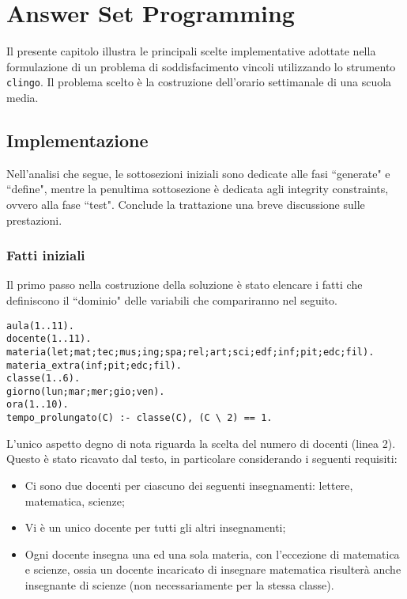 \chapter{Answer Set Programming}

Il presente capitolo illustra le principali scelte implementative adottate nella formulazione di un problema di soddisfacimento vincoli utilizzando lo strumento \texttt{clingo}. Il problema scelto è la costruzione dell'orario settimanale di una scuola media.


\section{Implementazione}
Nell'analisi che segue, le sottosezioni iniziali sono dedicate alle fasi ``generate" e ``define", mentre la penultima sottosezione è dedicata agli integrity constraints, ovvero alla fase ``test". Conclude la trattazione una breve discussione sulle prestazioni.

\subsection{Fatti iniziali}
Il primo passo nella costruzione della soluzione è stato elencare i fatti che definiscono il ``dominio" delle variabili che compariranno nel seguito.
\lstset{numbers=left,breaklines=true,language=Octave,basicstyle=\small\ttfamily}
\begin{lstlisting}[frame=single]
aula(1..11).
docente(1..11).
materia(let;mat;tec;mus;ing;spa;rel;art;sci;edf;inf;pit;edc;fil).
materia_extra(inf;pit;edc;fil).
classe(1..6).
giorno(lun;mar;mer;gio;ven).
ora(1..10).
tempo_prolungato(C) :- classe(C), (C \ 2) == 1.
\end{lstlisting}
L'unico aspetto degno di nota riguarda la scelta del numero di docenti (linea 2). Questo è stato ricavato dal testo, in particolare considerando i seguenti requisiti:
\begin{itemize}
\item Ci sono due docenti per ciascuno dei seguenti insegnamenti: lettere, matematica, scienze;
\item Vi è un unico docente per tutti gli altri insegnamenti;
\item Ogni docente insegna una ed una sola materia, con l'eccezione di matematica e scienze, ossia un docente 
incaricato di insegnare matematica risulterà anche insegnante di scienze (non necessariamente per la stessa classe).
\end{itemize}

